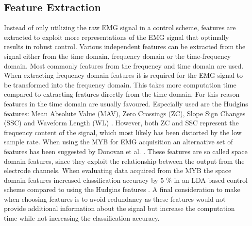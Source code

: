 \subsection{Feature Extraction}
Instead of only utilizing the raw EMG signal in a control scheme, features are extracted to exploit more representations of the EMG signal that optimally results in robust control. Various independent features can be extracted from the signal either from the time domain, frequency domain or the time-frequency domain. Most commonly features from the frequency and time domain are used. When extracting frequency domain features it is required for the EMG signal to be transformed into the frequency domain. This takes more computation time compared to extracting features directly from the time domain. For this reason features in the time domain are usually favoured. \cite{Phiny2012} Especially used are the Hudgins features: Mean Absolute Value (MAV), Zero Crossings (ZC), Slope Sign Changes (SSC) and Waveform Length (WL) \cite{Hudgins1993}. However, both ZC and SSC represent the frequency content of the signal, which most likely has been distorted by the low sample rate. When using the MYB for EMG acquisition an alternative set of features has been suggested by Donovan et al. \cite{Donovan2017}. These features are so called space domain features, since they exploit the relationship between the output from the electrode channels. When evaluating data acquired from the MYB the space domain features increased classification accuracy by 5 \% in an LDA-based control scheme compared to using the Hudgins features \cite{Donovan2017}. A final consideration to make when choosing features is to avoid redundancy as these features would not provide additional information about the signal but increase the computation time while not increasing the classification accuracy.    

